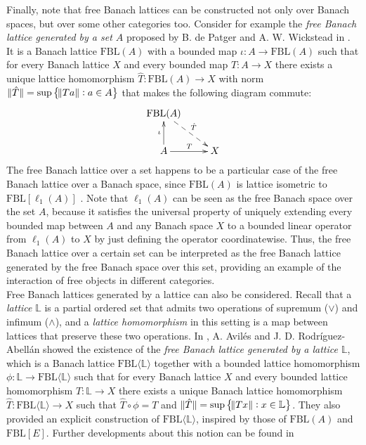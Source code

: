 \documentclass[12pt,leqno]{amsart}
\numberwithin{equation}{section} %
\theoremstyle{definition}
\numberwithin{equation}{section}
\newcommand{\Lbb}{\mathbb{L}}
\newcommand{\fbl}{\mathrm{FBL}}
\begin{document}
Finally, note that free Banach lattices can be constructed not only over Banach spaces, but over some other categories too. Consider for example the \textit{free Banach lattice generated by a set $A$} proposed by B. de Patger and A. W. Wickstead in \cite{dePW}. It is a Banach lattice $\fbl(A)$ with a bounded map $\iota:A\rightarrow \fbl(A)$ such that for every Banach lattice $X$ and every bounded map $T:A\rightarrow X$ there exists a unique lattice homomorphism $\hat{T}: \fbl(A)\rightarrow X$ with norm $\norm[0]{\hat{T}}=\sup\cbr{\norm{Ta}:a\in A}$ that makes the following diagram commute:
$$
\xymatrix{\fbl(A)\ar@{-->}[rd]^{\hat{T}}&\\
     A\ar[r]^{T}\ar^{\iota}[u]& X}
$$
The free Banach lattice over a set happens to be a particular case of the free Banach lattice over a Banach space, since $\fbl(A)$ is lattice isometric to $\fbl[\ell_1(A)]$ \cite[Corollary 2.9]{ART}. Note that $\ell_1(A)$ can be seen as the free Banach space over the set $A$, because it satisfies the universal property of uniquely extending every bounded map between $A$ and any Banach space $X$ to a bounded linear operator from $\ell_1(A)$ to $X$ by just defining the operator coordinatewise. Thus, the free Banach lattice over a certain set can be interpreted as the free Banach lattice generated by the free Banach space over this set, providing an example of the interaction of free objects in different categories.\\

Free Banach lattices generated by a lattice can also be considered. Recall that a \textit{lattice} $\Lbb$ is a partial ordered set that admits two operations of supremum ($\vee$) and infimum ($\wedge$), and a \textit{lattice homomorphism} in this setting is a map between lattices that preserve these two operations. In \cite{AR1}, A. Avil\'es and J. D. Rodr\'iguez-Abell\'an showed the existence of the \textit{free Banach lattice generated by a lattice $\Lbb$}, which is a Banach lattice $\fbl\langle \Lbb \rangle$ together with a bounded lattice homomorphism $\phi:\Lbb\rightarrow \fbl\langle \Lbb \rangle$ such that for every Banach lattice $X$ and every bounded lattice homomorphism $T:\Lbb \rightarrow X$ there exists a unique Banach lattice homomorphism $\hat{T}: \fbl\langle \Lbb \rangle\rightarrow X$ such that $\hat{T}\circ \phi=T$ and $\norm[0]{\hat{T}}=\sup\cbr{\norm{Tx}: x\in \Lbb}$. They also provided an explicit construction of $\fbl\langle \Lbb \rangle$, inspired by those of $\fbl(A)$ and $\fbl[E]$. Further developments about this notion can be found in \cite{AMRR,AMRR2,AR}\\
\end{document}

